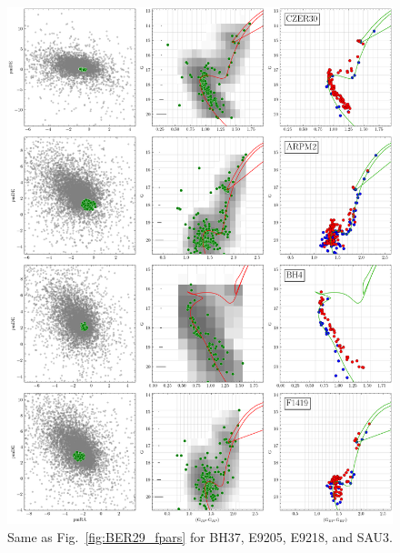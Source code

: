 \documentclass[draft]{aa}
\begin{document}
\begin{appendix}
 \begin{figure}
  \centering
  \includegraphics[height=.95\textheight]{figs/8_fpars.png}
  \caption{Same as Fig.~\ref{fig:BER29_fpars} for BH37, E9205, E9218, and SAU3.}
  \label{fig:12fpars}
 \end{figure}


\end{appendix}
\end{document}
